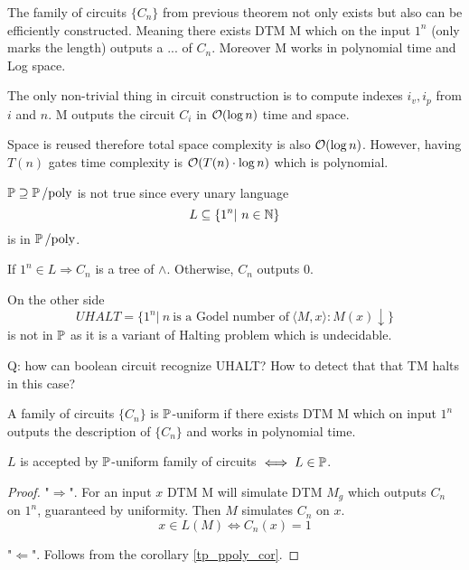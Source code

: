 \begin{corollary}\label{tp_ppoly_cor}
	The family of circuits $\{C_n\}$ from previous theorem not only exists but also can be efficiently constructed.
	Meaning there exists DTM M which on the input $1^n$ (only marks the length) outputs a ... of $C_n$.
	Moreover M works in polynomial time and Log space.

	The only non-trivial thing in circuit construction is to compute indexes $i_v, i_p$ from $i$ and $n$.
	M outputs the circuit $C_i$ in $\mathcal{O}(\log n)$ time and space.

	Space is reused therefore total space complexity is also $\mathcal{O}(\log n)$.
	However, having $T(n)$ gates time complexity is $\mathcal{O}(T(n) \cdot \log n)$ which is polynomial.
\end{corollary}

\begin{note}[$\TP \nsupseteq \Ppoly$]
	$\operatorname{\mathbb{P}} \supseteq \operatorname{\operatorname{\mathbb{P}}/poly}$ is not true since every unary language
	\[ L \subseteq \{ 1^n |\ n \in \operatorname{\mathbb{N}} \} \]
	is in $\operatorname{\operatorname{\mathbb{P}}/poly}$.

	If $1^n \in L \Rightarrow C_n$ is a tree of $\land$.
	Otherwise, $C_n$ outputs 0.

	On the other side
	\[ UHALT = \{ 1^n |\ n\ \text{is a Godel number of}\ \langle M, x \rangle: M(x) \downarrow \} \]
	is not in $\operatorname{\mathbb{P}}$ as it is a variant of Halting problem which is undecidable.

	Q: how can boolean circuit recognize UHALT? How to detect that that TM halts in this case?
\end{note}

\begin{definition}
	A family of circuits $\{C_n\}$ is $\operatorname{\mathbb{P}}$-uniform if there exists DTM M which on input $1^n$ outputs the description of $\{C_n\}$ and works in polynomial time.
\end{definition}

\begin{theorem}
	$L$ is accepted by $\operatorname{\mathbb{P}}$-uniform family of circuits $\iff L \in \operatorname{\mathbb{P}}$.
\end{theorem}
\begin{proof}
	"$\Rightarrow$". For an input $x$ DTM M will simulate DTM $M_g$ which outputs $C_n$ on $1^n$, guaranteed by uniformity.
	Then $M$ simulates $C_n$ on $x$.
	\[ x \in L(M) \iff C_n(x) = 1 \]

	"$\Leftarrow$". Follows from the corollary \cref{tp_ppoly_cor}.
\end{proof}

